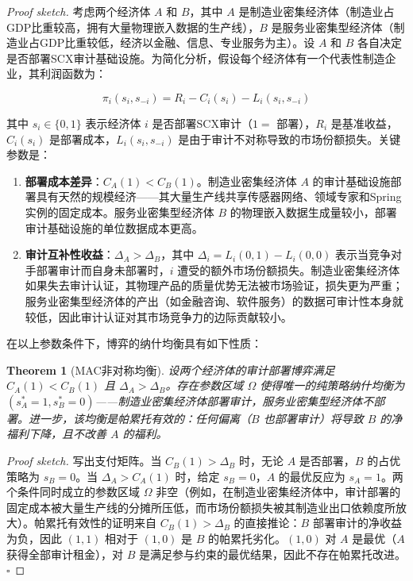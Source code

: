 \documentclass[12pt,a4paper]{ctexart}
\newtheorem{theorem}{Theorem}[section]
\theoremstyle{definition}
\theoremstyle{remark}
\begin{document}
\begin{proof}[Proof sketch]
考虑两个经济体 $A$ 和 $B$，其中 $A$ 是制造业密集经济体（制造业占GDP比重较高，拥有大量物理嵌入数据的生产线），$B$ 是服务业密集型经济体（制造业占GDP比重较低，经济以金融、信息、专业服务为主）。设 $A$ 和 $B$ 各自决定是否部署SCX审计基础设施。为简化分析，假设每个经济体有一个代表性制造企业，其利润函数为：

\begin{equation}
\pi_i(s_i, s_{-i}) = R_i - C_i(s_i) - L_i(s_i, s_{-i})
\end{equation}

其中 $s_i \in \{0, 1\}$ 表示经济体 $i$ 是否部署SCX审计（$1 = $ 部署），$R_i$ 是基准收益，$C_i(s_i)$ 是部署成本，$L_i(s_i, s_{-i})$ 是由于审计不对称导致的市场份额损失。关键参数是：

\begin{enumerate}[label=(\roman*)]
    \item \textbf{部署成本差异}：$C_A(1) < C_B(1)$。制造业密集经济体 $A$ 的审计基础设施部署具有天然的规模经济——其大量生产线共享传感器网络、领域专家和Spring实例的固定成本。服务业密集型经济体 $B$ 的物理嵌入数据生成量较小，部署审计基础设施的单位数据成本更高。
    \item \textbf{审计互补性收益}：$\Delta_A > \Delta_B$，其中 $\Delta_i = L_i(0, 1) - L_i(0, 0)$ 表示当竞争对手部署审计而自身未部署时，$i$ 遭受的额外市场份额损失。制造业密集经济体如果失去审计认证，其物理产品的质量优势无法被市场验证，损失更为严重；服务业密集型经济体的产出（如金融咨询、软件服务）的数据可审计性本身就较低，因此审计认证对其市场竞争力的边际贡献较小。
\end{enumerate}

在以上参数条件下，博弈的纳什均衡具有如下性质：

\begin{theorem}[MAC非对称均衡]
\label{thm:mac-asymmetric}
设两个经济体的审计部署博弈满足 $C_A(1) < C_B(1)$ 且 $\Delta_A > \Delta_B$。存在参数区域 $\Omega$ 使得唯一的纯策略纳什均衡为 $(s_A^* = 1, s_B^* = 0)$——制造业密集经济体部署审计，服务业密集型经济体不部署。进一步，该均衡是帕累托有效的：任何偏离（$B$ 也部署审计）将导致 $B$ 的净福利下降，且不改善 $A$ 的福利。
\end{theorem}

\textit{Proof sketch.} 写出支付矩阵。当 $C_B(1) > \Delta_B$ 时，无论 $A$ 是否部署，$B$ 的占优策略为 $s_B = 0$。当 $\Delta_A > C_A(1)$ 时，给定 $s_B = 0$，$A$ 的最优反应为 $s_A = 1$。两个条件同时成立的参数区域 $\Omega$ 非空（例如，在制造业密集经济体中，审计部署的固定成本被大量生产线的分摊所压低，而市场份额损失被其制造业出口依赖度所放大）。帕累托有效性的证明来自 $C_B(1) > \Delta_B$ 的直接推论：$B$ 部署审计的净收益为负，因此 $(1, 1)$ 相对于 $(1, 0)$ 是 $B$ 的帕累托劣化。$(1, 0)$ 对 $A$ 是最优（$A$ 获得全部审计租金），对 $B$ 是满足参与约束的最优结果，因此不存在帕累托改进。\hfill $\square$


\end{proof}
\end{document}
